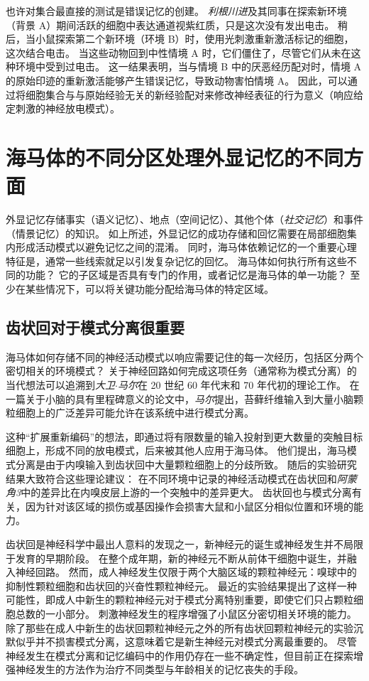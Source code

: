也许对集合最直接的测试是错误记忆的创建。
\textit{利根川进}及其同事在探索新环境（背景 A）期间活跃的细胞中表达通道视紫红质，只是这次没有发出电击。
稍后，当小鼠探索第二个新环境（环境 B）时，使用光刺激重新激活标记的细胞，这次结合电击。
当这些动物回到中性情境 A 时，它们僵住了，尽管它们从未在这种环境中受到过电击。
这一结果表明，当与情境 B 中的厌恶经历配对时，情境 A 的原始印迹的重新激活能够产生错误记忆，导致动物害怕情境 A。
因此，可以通过将细胞集合与与原始经验无关的新经验配对来修改神经表征的行为意义（响应给定刺激的神经放电模式）。



\section{海马体的不同分区处理外显记忆的不同方面}

外显记忆存储事实（语义记忆）、地点（空间记忆）、其他个体（\textit{社交记忆}）和事件（情景记忆）的知识。
如上所述，外显记忆的成功存储和回忆需要在局部细胞集内形成活动模式以避免记忆之间的混淆。
同时，海马体依赖记忆的一个重要心理特征是，通常一些线索就足以引发复杂记忆的回忆。
海马体如何执行所有这些不同的功能？
它的子区域是否具有专门的作用，或者记忆是海马体的单一功能？
至少在某些情况下，可以将关键功能分配给海马体的特定区域。



\subsection{齿状回对于模式分离很重要}

海马体如何存储不同的神经活动模式以响应需要记住的每一次经历，包括区分两个密切相关的环境模式？
关于神经回路如何完成这项任务（通常称为模式分离）的当代想法可以追溯到\textit{大卫$\cdot$马尔}在 20 世纪 60 年代末和 70 年代初的理论工作。
在一篇关于小脑的具有里程碑意义的论文中，\textit{马尔}提出，苔藓纤维输入到大量小脑颗粒细胞上的广泛差异可能允许在该系统中进行模式分离。


这种“扩展重新编码”的想法，即通过将有限数量的输入投射到更大数量的突触目标细胞上，形成不同的放电模式，后来被其他人应用于海马体。
他们提出，海马模式分离是由于内嗅输入到齿状回中大量颗粒细胞上的分歧所致。
随后的实验研究结果大致符合这些理论建议：
在不同环境中记录的神经活动模式在齿状回和\textit{阿蒙角3}中的差异比在内嗅皮层上游的一个突触中的差异更大。
齿状回也与模式分离有关，因为针对该区域的损伤或基因操作会损害大鼠和小鼠区分相似位置和环境的能力。


齿状回是神经科学中最出人意料的发现之一，新神经元的诞生或神经发生并不局限于发育的早期阶段。
在整个成年期，新的神经元不断从前体干细胞中诞生，并融入神经回路。
然而，成人神经发生仅限于两个大脑区域的颗粒神经元：嗅球中的抑制性颗粒细胞和齿状回的兴奋性颗粒神经元。
最近的实验结果提出了这样一种可能性，即成人中新生的颗粒神经元对于模式分离特别重要，即使它们只占颗粒细胞总数的一小部分。
刺激神经发生的程序增强了小鼠区分密切相关环境的能力。
除了那些在成人中新生的齿状回颗粒神经元之外的所有齿状回颗粒神经元的实验沉默似乎并不损害模式分离，这意味着它是新生神经元对模式分离最重要的。
尽管神经发生在模式分离和记忆编码中的作用仍存在一些不确定性，但目前正在探索增强神经发生的方法作为治疗不同类型与年龄相关的记忆丧失的手段。



